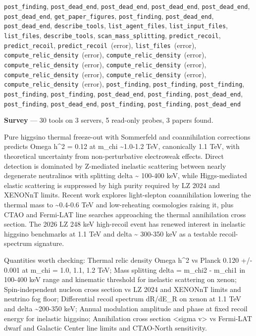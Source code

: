 \documentclass[11pt,a4paper]{article}
\begin{document}
\texttt{post\_finding}, \texttt{post\_dead\_end}, \texttt{post\_dead\_end}, \texttt{post\_dead\_end}, \texttt{post\_dead\_end}, \texttt{post\_dead\_end}, \texttt{get\_paper\_figures}, \texttt{post\_finding}, \texttt{post\_dead\_end}, \texttt{post\_dead\_end}, \texttt{describe\_tools}, \texttt{list\_agent\_files}, \texttt{list\_input\_files}, \texttt{list\_files}, \texttt{describe\_tools}, \texttt{scan\_mass\_splitting}, \texttt{predict\_recoil}, \texttt{predict\_recoil}, \texttt{predict\_recoil}~(error), \texttt{list\_files}~(error), \texttt{compute\_relic\_density}~(error), \texttt{compute\_relic\_density}~(error), \texttt{compute\_relic\_density}~(error), \texttt{compute\_relic\_density}~(error), \texttt{compute\_relic\_density}~(error), \texttt{compute\_relic\_density}~(error), \texttt{compute\_relic\_density}~(error), \texttt{post\_finding}, \texttt{post\_finding}, \texttt{post\_finding}, \texttt{post\_finding}, \texttt{post\_finding}, \texttt{post\_dead\_end}, \texttt{post\_finding}, \texttt{post\_dead\_end}, \texttt{post\_finding}, \texttt{post\_dead\_end}, \texttt{post\_finding}, \texttt{post\_finding}, \texttt{post\_dead\_end}\par
\textbf{Survey} --- 30 tools on 3 servers, 5 read-only probes, 3 papers found.

Pure higgsino thermal freeze-out with Sommerfeld and coannihilation corrections predicts Omega h\textasciicircum{}2 = 0.12 at m\_chi \textasciitilde{}1.0-1.2 TeV, canonically 1.1 TeV, with theoretical uncertainty from non-perturbative electroweak effects. Direct detection is dominated by Z-mediated inelastic scattering between nearly degenerate neutralinos with splitting delta \textasciitilde{} 100-400 keV, while Higgs-mediated elastic scattering is suppressed by high purity required by LZ 2024 and XENONnT limits. Recent work explores light-slepton coannihilation lowering the thermal mass to \textasciitilde{}0.4-0.6 TeV and low-reheating cosmologies raising it, plus CTAO and Fermi-LAT line searches approaching the thermal annihilation cross section. The 2026 LZ 248 keV high-recoil event has renewed interest in inelastic higgsino benchmarks at 1.1 TeV and delta \textasciitilde{} 300-350 keV as a testable recoil-spectrum signature.

Quantities worth checking: Thermal relic density Omega h\textasciicircum{}2 vs Planck 0.120 +/- 0.001 at m\_chi = 1.0, 1.1, 1.2 TeV; Mass splitting delta = m\_chi2 - m\_chi1 in 100-400 keV range and kinematic threshold for inelastic scattering on xenon; Spin-independent nucleon cross section vs LZ 2024 and XENONnT limits and neutrino fog floor; Differential recoil spectrum dR/dE\_R on xenon at 1.1 TeV and delta \textasciitilde{}200-350 keV; Annual modulation amplitude and phase at fixed recoil energy for inelastic higgsino; Annihilation cross section \textless{}sigma v\textgreater{} vs Fermi-LAT dwarf and Galactic Center line limits and CTAO-North sensitivity.
\end{document}

